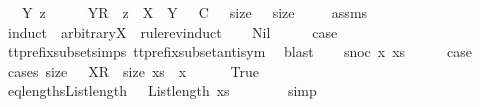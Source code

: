 \begin{isabellebody}
\ \ \ {\isachardoublequoteopen}{\isasymexists}Y\ z\ {\isasymrho}\ {\isasymsigma}\ {\isacharequal}\ {\isasymrho}\ {\isacharat}\ {\isacharparenleft}{\isacharbrackleft}{\isacharbrackleft}Y{\isacharbrackright}\isactrlsub R{\isacharbrackright}\ {\isacharat}\ z{\isacharparenright}\ {\isasymand}\ X\ {\isasymsubseteq}\ Y\ {\isasymand}\ {\isasymrho}\ {\isasymlesssim}\isactrlsub C\ {\isasymrho}\ {\isasymand}\ size\ {\isasymrho}\ {\isacharequal}\ size\ {\isasymrho}{\isachardoublequoteclose}\isanewline
%
\isadelimproof
\ \ %
\endisadelimproof
%
\isatagproof
{}\isamarkupfalse%
\ assms\ \isamarkupfalse%
\ {\isacharparenleft}induct\ {\isasymsigma}\ arbitrary{\isacharcolon}X\ {\isasymrho}\ rule{\isacharcolon}rev{\isacharunderscore}induct{\isacharparenright}\isanewline
\ \ \isamarkupfalse%
\ Nil\isanewline
\ \ \isamarkupfalse%
\ \isamarkupfalse%
\ {\isacharquery}case\ \isamarkupfalse%
\ tt{\isacharunderscore}prefix{\isacharunderscore}subset{\isachardot}simps{\isacharparenleft}{}{\isacharparenright}\ tt{\isacharunderscore}prefix{\isacharunderscore}subset{\isacharunderscore}antisym\ \isamarkupfalse%
\ blast\isanewline
{}\isamarkupfalse%
\isanewline
\ \ \isamarkupfalse%
\ {\isacharparenleft}snoc\ x\ xs{\isacharparenright}\isanewline
\ \ \isamarkupfalse%
\ \isamarkupfalse%
\ {\isacharquery}case\isanewline
\ \ \isamarkupfalse%
\ {\isacharparenleft}cases\ {\isachardoublequoteopen}size\ {\isacharparenleft}{\isasymrho}\ {\isacharat}\ {\isacharbrackleft}{\isacharbrackleft}X{\isacharbrackright}\isactrlsub R{\isacharbrackright}{\isacharparenright}\ {\isacharequal}\ size\ {\isacharparenleft}xs\ {\isacharat}\ {\isacharbrackleft}x{\isacharbrackright}{\isacharparenright}{\isachardoublequoteclose}{\isacharparenright}\isanewline
\ \ \ \ \isamarkupfalse%
\ True\isanewline
\ \ \ \ \isamarkupfalse%
\ \isamarkupfalse%
\ eq{\isacharunderscore}lengths{\isacharcolon}{\isachardoublequoteopen}List{\isachardot}length\ {\isacharparenleft}{\isasymrho}{\isacharparenright}\ {\isacharequal}\ List{\isachardot}length\ {\isacharparenleft}xs{\isacharparenright}{\isachardoublequoteclose}\isanewline
\ \ \ \ \ \ \isamarkupfalse%
\ simp\isanewline
\ \ \ \ \isamarkupfalse%
\ \isamarkupfalse%

\end{isabellebody}
